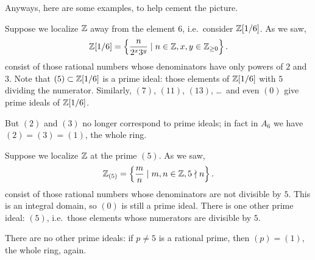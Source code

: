 Anyways, here are some examples, to help cement the picture.
\begin{example}
	Suppose we localize $\mathbb Z$ away from the element $6$,
	i.e.\ consider $\mathbb Z[1/6]$.
	As we saw,
	\[ \mathbb Z[1/6] = \left\{ \frac{n}{2^x 3^y} \mid n \in \mathbb Z,
		x,y \in \mathbb Z_{\ge 0} \right\}.  \]
	consist of those rational numbers whose
	denominators have only powers of $2$ and $3$.
	Note that $(5) \subset \mathbb Z[1/6]$ is a prime ideal:
	those elements of $\mathbb Z[1/6]$ with $5$ dividing the numerator.
	Similarly, $(7)$, $(11)$, $(13)$, \dots\
	and even $(0)$ give prime ideals of $\mathbb Z[1/6]$.

	But $(2)$ and $(3)$ no longer correspond to
	prime ideals; in fact in $A_6$ we have $(2) = (3) = (1)$,
	the whole ring.
\end{example}

\begin{example}
	Suppose we localize $\mathbb Z$ at the prime $(5)$.
	As we saw,
	\[ \mathbb Z_{(5)} = \left\{ \frac{m}{n} \mid m,n \in \mathbb Z,
			5 \nmid n \right\}.  \]
	consist of those rational numbers whose
	denominators are not divisible by $5$.
	This is an integral domain, so $(0)$ is still a prime ideal.
	There is one other prime ideal: $(5)$,
	i.e.\ those elements whose numerators are divisible by $5$.

	There are no other prime ideals:
	if $p \ne 5$ is a rational prime,
	then $(p) = (1)$, the whole ring, again.
\end{example}

